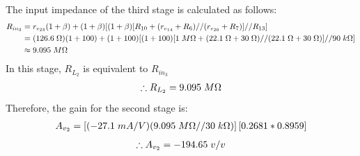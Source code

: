 \documentclass{article}
\begin{document}
	The input impedance of the third stage is calculated as follows:
	\begin{align*}
		R_{in_3} &= r_{e_{23}} (1 + \beta) + (1 + \beta) [(1 + \beta)[R_{10} + (r_{e_{14}} + R_6) // (r_{e_{20}} + R_7)] // R_{13}]\\
		&= (126.6 \hspace{1mm} \Omega) (1 + 100) + (1 + 100) [(1 + 100)[1 \hspace{1mm} M\Omega + (22.1 \hspace{1mm} \Omega + 30 \hspace{1mm} \Omega) // (22.1 \hspace{1mm} \Omega + 30 \hspace{1mm} \Omega)] // 90 \hspace{1mm} k\Omega]\\
		&\approx 9.095 \hspace{1mm} M\Omega
	\end{align*}
	In this stage, $R_{L_2}$ is equivalent to $R_{in_3}$
	\begin{align*}
	\therefore R_{L_2} =  9.095 \hspace{1mm} M\Omega
	\end{align*}
	Therefore, the gain for the second stage is:
	\begin{align*}
		A_{v_2}  = \left[(-27.1 \hspace{1mm} mA/V)(9.095 \hspace{1mm} M\Omega // 30 \hspace{1mm} k\Omega)\right][0.2681 * 0.8959]
	\end{align*}
	\begin{align*}
		\therefore A_{v_2} = -194.65 \hspace{1mm} v/v
	\end{align*}
	\pagebreak
\end{document}
